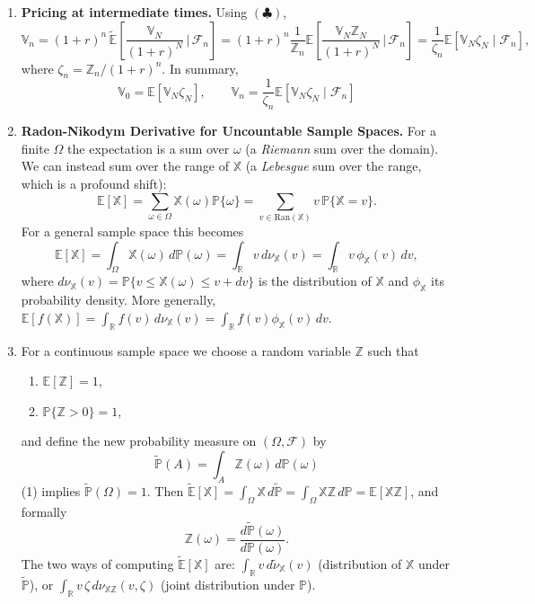 \begin{enumerate}
    \item \textbf{Pricing at intermediate times.} Using $(\clubsuit)$,
    \[\mathbb{V}_n = (1+r)^n\,\tilde{\mathbb{E}}\left[\frac{\mathbb{V}_N}{(1+r)^N}\,\Big|\,\mathcal{F}_n\right] = (1+r)^n\frac{1}{\mathbb{Z}_n}\mathbb{E}\left[\frac{\mathbb{V}_N\mathbb{Z}_N}{(1+r)^N}\,\Big|\,\mathcal{F}_n\right] = \frac{1}{\zeta_n}\mathbb{E}[\mathbb{V}_N\zeta_N \mid \mathcal{F}_n],\]
    where $\zeta_n = \mathbb{Z}_n/(1+r)^n$. In summary,
    \[\boxed{\mathbb{V}_0 = \mathbb{E}[\mathbb{V}_N\zeta_N], \qquad \mathbb{V}_n = \frac{1}{\zeta_n}\mathbb{E}[\mathbb{V}_N\zeta_N \mid \mathcal{F}_n]}\]

    \item \textbf{Radon-Nikodym Derivative for Uncountable Sample Spaces.} For a finite $\Omega$ the expectation is a sum over $\omega$ (a \textit{Riemann} sum over the domain). We can instead sum over the range of $\mathbb{X}$ (a \textit{Lebesgue} sum over the range, which is a profound shift):
    \[\mathbb{E}[\mathbb{X}] = \sum_{\omega \in \Omega}\mathbb{X}(\omega)\mathbb{P}\{\omega\} = \sum_{v \in \text{Ran}(\mathbb{X})} v\, \mathbb{P}\{\mathbb{X} = v\}.\]
    For a general sample space this becomes
    \[\mathbb{E}[\mathbb{X}] = \int_\Omega \mathbb{X}(\omega)\, d\mathbb{P}(\omega) = \int_{\mathbb{R}} v\, d\nu_{\mathbb{X}}(v) = \int_{\mathbb{R}} v\, \phi_{\mathbb{X}}(v)\, dv,\]
    where $d\nu_{\mathbb{X}}(v) = \mathbb{P}\{v \leq \mathbb{X}(\omega) \leq v + dv\}$ is the distribution of $\mathbb{X}$ and $\phi_{\mathbb{X}}$ its probability density. More generally, $\mathbb{E}[f(\mathbb{X})] = \int_{\mathbb{R}} f(v)\,d\nu_{\mathbb{X}}(v) = \int_{\mathbb{R}} f(v)\phi_{\mathbb{X}}(v)\,dv$.

    \item For a continuous sample space we choose a random variable $\mathbb{Z}$ such that
    \begin{enumerate}
        \item $\mathbb{E}[\mathbb{Z}] = 1$,
        \item $\mathbb{P}\{\mathbb{Z} > 0\} = 1$,
    \end{enumerate}
    and define the new probability measure on $(\Omega, \mathcal{F})$ by
    \[\boxed{\tilde{\mathbb{P}}(A) = \int_A \mathbb{Z}(\omega)\, d\mathbb{P}(\omega)}\]
    (1) implies $\tilde{\mathbb{P}}(\Omega) = 1$. Then $\tilde{\mathbb{E}}[\mathbb{X}] = \int_\Omega\mathbb{X}\, d\tilde{\mathbb{P}} = \int_\Omega\mathbb{X}\mathbb{Z}\, d\mathbb{P} = \mathbb{E}[\mathbb{X}\mathbb{Z}]$, and formally
    \[\mathbb{Z}(\omega) = \frac{d\tilde{\mathbb{P}}(\omega)}{d\mathbb{P}(\omega)}.\]
    The two ways of computing $\tilde{\mathbb{E}}[\mathbb{X}]$ are: $\int_{\mathbb{R}}v\, d\tilde{\nu}_{\mathbb{X}}(v)$ (distribution of $\mathbb{X}$ under $\tilde{\mathbb{P}}$), or $\int_{\mathbb{R}}v\,\zeta\, d\nu_{\mathbb{X}\mathbb{Z}}(v, \zeta)$ (joint distribution under $\mathbb{P}$).


\end{enumerate}
